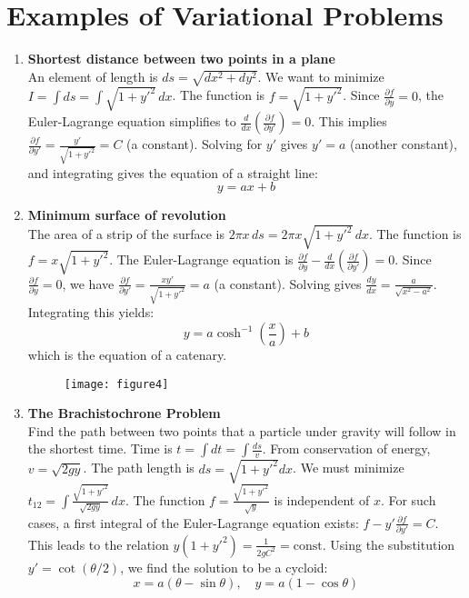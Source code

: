 \documentclass[12pt]{article}
\begin{document}
	\section*{ Examples of Variational Problems}
	\begin{enumerate}
		\item \textbf{Shortest distance between two points in a plane} \\
		An element of length is $ds = \sqrt{dx^2+dy^2}$. We want to minimize $I = \int ds = \int \sqrt{1+y'^2} \, dx$.
		The function is $f = \sqrt{1+y'^2}$. Since $\frac{\partial f}{\partial y} = 0$, the Euler-Lagrange equation simplifies to $\frac{d}{dx}(\frac{\partial f}{\partial y'}) = 0$.
		This implies $\frac{\partial f}{\partial y'} = \frac{y'}{\sqrt{1+y'^2}} = C$ (a constant).
		Solving for $y'$ gives $y' = a$ (another constant), and integrating gives the equation of a straight line:
		\begin{equation*}
			y = ax + b
		\end{equation*}
		
		\item \textbf{Minimum surface of revolution} \\
		The area of a strip of the surface is $2\pi x \, ds = 2\pi x \sqrt{1+y'^2} \, dx$.
		The function is $f = x\sqrt{1+y'^2}$. The Euler-Lagrange equation is $\frac{\partial f}{\partial y} - \frac{d}{dx}(\frac{\partial f}{\partial y'}) = 0$.
		Since $\frac{\partial f}{\partial y} = 0$, we have $\frac{\partial f}{\partial y'} = \frac{x y'}{\sqrt{1+y'^2}} = a$ (a constant).
		Solving gives $\frac{dy}{dx} = \frac{a}{\sqrt{x^2-a^2}}$. Integrating this yields:
		\begin{equation*}
			y = a \cosh^{-1}\left(\frac{x}{a}\right) + b
		\end{equation*}
		which is the equation of a catenary.
		

        \begin{figure}[h]
        	\centering
        	\texttt{[image: figure4]}
          	\caption{}
	        \label{fig:figure4}
        \end{figure}

		\item \textbf{The Brachistochrone Problem} \\
		Find the path between two points that a particle under gravity will follow in the shortest time.
		Time is $t = \int dt = \int \frac{ds}{v}$. From conservation of energy, $v=\sqrt{2gy}$. The path length is $ds=\sqrt{1+y'^2}dx$.
		We must minimize $t_{12} = \int \frac{\sqrt{1+y'^2}}{\sqrt{2gy}} \, dx$.
		The function $f = \frac{\sqrt{1+y'^2}}{\sqrt{y}}$ is independent of $x$. For such cases, a first integral of the Euler-Lagrange equation exists: $f - y'\frac{\partial f}{\partial y'} = C$.
		This leads to the relation $y(1+y'^2) = \frac{1}{2gC^2} = \text{const}$.
		Using the substitution $y' = \cot(\theta/2)$, we find the solution to be a cycloid:
		\begin{equation*}
			x = a(\theta - \sin\theta), \quad y = a(1 - \cos\theta)
		\end{equation*}
		


\end{enumerate}
\end{document}
